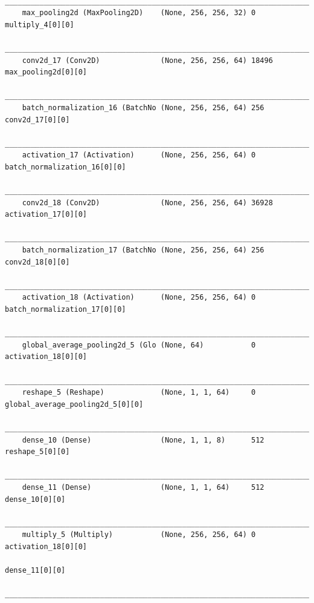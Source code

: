 {\begin{verbatim}
    __________________________________________________________________________________________________
    max_pooling2d (MaxPooling2D)    (None, 256, 256, 32) 0           multiply_4[0][0]                 
    __________________________________________________________________________________________________
    conv2d_17 (Conv2D)              (None, 256, 256, 64) 18496       max_pooling2d[0][0]              
    __________________________________________________________________________________________________
    batch_normalization_16 (BatchNo (None, 256, 256, 64) 256         conv2d_17[0][0]                  
    __________________________________________________________________________________________________
    activation_17 (Activation)      (None, 256, 256, 64) 0           batch_normalization_16[0][0]     
    __________________________________________________________________________________________________
    conv2d_18 (Conv2D)              (None, 256, 256, 64) 36928       activation_17[0][0]              
    __________________________________________________________________________________________________
    batch_normalization_17 (BatchNo (None, 256, 256, 64) 256         conv2d_18[0][0]                  
    __________________________________________________________________________________________________
    activation_18 (Activation)      (None, 256, 256, 64) 0           batch_normalization_17[0][0]     
    __________________________________________________________________________________________________
    global_average_pooling2d_5 (Glo (None, 64)           0           activation_18[0][0]              
    __________________________________________________________________________________________________
    reshape_5 (Reshape)             (None, 1, 1, 64)     0           global_average_pooling2d_5[0][0] 
    __________________________________________________________________________________________________
    dense_10 (Dense)                (None, 1, 1, 8)      512         reshape_5[0][0]                  
    __________________________________________________________________________________________________
    dense_11 (Dense)                (None, 1, 1, 64)     512         dense_10[0][0]                   
    __________________________________________________________________________________________________
    multiply_5 (Multiply)           (None, 256, 256, 64) 0           activation_18[0][0]              
                                                                        dense_11[0][0]                   
    __________________________________________________________________________________________________

\end{verbatim}}
